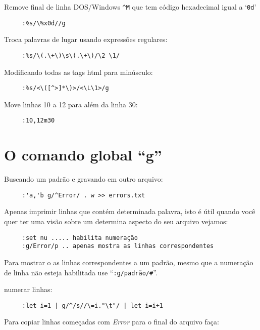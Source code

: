 Remove final de linha DOS/Windows \verb|^M| que tem código hexadecimal igual a
`{\tt 0d}'

\begin{verbatim}
     :%s/\%x0d//g
\end{verbatim}

Troca palavras de lugar usando expressões regulares:

\begin{verbatim}
     :%s/\(.\+\)\s\(.\+\)/\2 \1/
\end{verbatim}

Modificando todas as tags html para minúsculo:

\begin{verbatim}
     :%s/<\([^>]*\)>/<\L\1>/g
\end{verbatim}

Move linhas 10 a 12 para além da linha 30:

\begin{verbatim}
     :10,12m30
\end{verbatim}

\section{O comando global ``g''}\label{sec:O comando global ``g''}

Buscando um padrão e gravando em outro arquivo:

\begin{verbatim}
     :'a,'b g/^Error/ . w >> errors.txt
\end{verbatim}

Apenas imprimir linhas que contém determinada palavra, isto é útil
quando você quer ter uma visão sobre um determina aspecto
do seu arquivo vejamos:

\begin{verbatim}
     :set nu ..... habilita numeração
     :g/Error/p .. apenas mostra as linhas correspondentes
\end{verbatim}

{\Large {}} Para mostrar o as linhas correspondentes a um padrão, mesmo que 
a numeração de linha não esteja habilitada use ``{\tt :g/padrão/\#}''.

numerar linhas:

\begin{verbatim}
     :let i=1 | g/^/s//\=i."\t"/ | let i=i+1
\end{verbatim}

Para copiar linhas começadas com {\em Error} para o final do arquivo faça:

